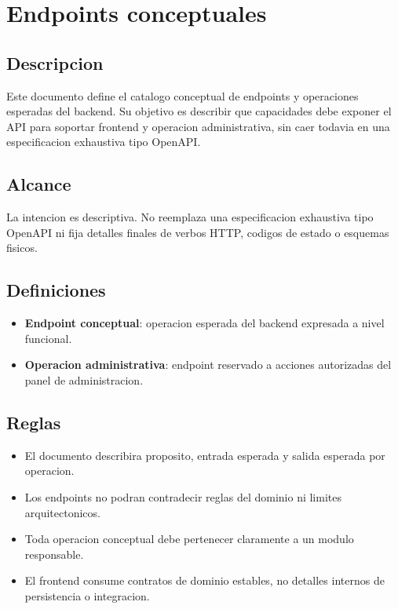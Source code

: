 \section{Endpoints conceptuales}

\subsection{Descripcion}

Este documento define el catalogo conceptual de endpoints y operaciones esperadas del backend. Su objetivo es describir que capacidades debe exponer el API para soportar frontend y operacion administrativa, sin caer todavia en una especificacion exhaustiva tipo OpenAPI.

\subsection{Alcance}

La intencion es descriptiva. No reemplaza una especificacion exhaustiva tipo OpenAPI ni fija detalles finales de verbos HTTP, codigos de estado o esquemas fisicos.

\subsection{Definiciones}

\begin{itemize}
  \item \textbf{Endpoint conceptual}: operacion esperada del backend expresada a nivel funcional.
  \item \textbf{Operacion administrativa}: endpoint reservado a acciones autorizadas del panel de administracion.
\end{itemize}

\subsection{Reglas}

\begin{itemize}
  \item El documento describira proposito, entrada esperada y salida esperada por operacion.
  \item Los endpoints no podran contradecir reglas del dominio ni limites arquitectonicos.
  \item Toda operacion conceptual debe pertenecer claramente a un modulo responsable.
  \item El frontend consume contratos de dominio estables, no detalles internos de persistencia o integracion.
\end{itemize}

